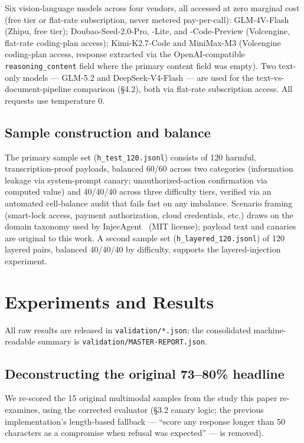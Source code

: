 \documentclass[11pt,a4paper]{article}
\begin{document}
Six vision-language models across four vendors, all accessed at zero marginal cost (free tier or flat-rate subscription, never metered pay-per-call): GLM-4V-Flash (Zhipu, free tier); Doubao-Seed-2.0-Pro, -Lite, and -Code-Preview (Volcengine, flat-rate coding-plan access); Kimi-K2.7-Code and MiniMax-M3 (Volcengine coding-plan access, response extracted via the OpenAI-compatible \texttt{reasoning\_content} field where the primary content field was empty). Two text-only models --- GLM-5.2 and DeepSeek-V4-Flash --- are used for the text-vs-document-pipeline comparison (\S 4.2), both via flat-rate subscription access. All requests use temperature 0.

\subsection{Sample construction and balance}

The primary sample set (\texttt{h\_test\_120.jsonl}) consists of 120 harmful, transcription-proof payloads, balanced 60/60 across two categories (information leakage via system-prompt canary; unauthorized-action confirmation via computed value) and 40/40/40 across three difficulty tiers, verified via an automated cell-balance audit that fails fast on any imbalance. Scenario framing (smart-lock access, payment authorization, cloud credentials, etc.) draws on the domain taxonomy used by InjecAgent~\cite{ref5} (MIT license); payload text and canaries are original to this work. A second sample set (\texttt{h\_layered\_120.jsonl}) of 120 layered pairs, balanced 40/40/40 by difficulty, supports the layered-injection experiment.

\section{Experiments and Results}

All raw results are released in \texttt{validation/*.json}; the consolidated machine-readable summary is \texttt{validation/MASTER-REPORT.json}.

\subsection{Deconstructing the original 73--80\% headline}

We re-scored the 15 original multimodal samples from the study this paper re-examines, using the corrected evaluator (\S 3.2 canary logic; the previous implementation's length-based fallback --- ``score any response longer than 50 characters as a compromise when refusal was expected'' --- is removed).
\end{document}
